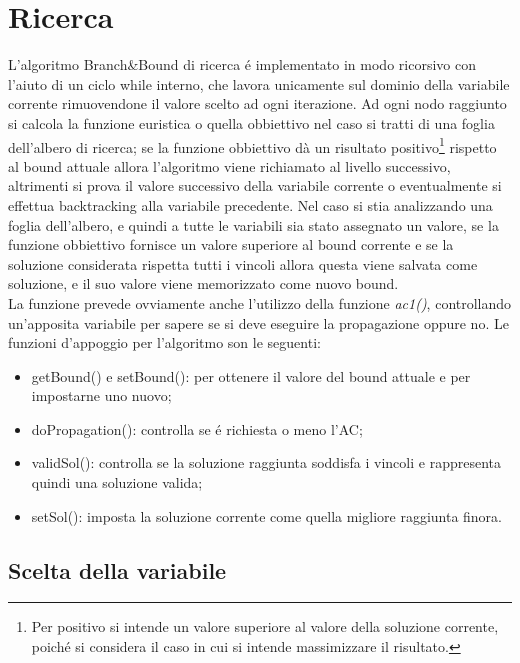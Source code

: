\documentclass[a4paper,12pt,italian]{article}
\begin{document}
\section{Ricerca}


L'algoritmo Branch\&Bound di ricerca \'e implementato in modo ricorsivo
con l'aiuto di un ciclo while interno, che lavora unicamente sul
dominio della variabile corrente rimuovendone il valore scelto ad ogni iterazione.
Ad ogni nodo raggiunto si calcola la funzione euristica o quella obbiettivo nel caso si tratti
di una foglia dell'albero di ricerca; se la funzione obbiettivo d\`a un
risultato positivo\footnote{Per positivo si intende un valore
  superiore al valore della soluzione corrente, poich\'e
si considera il caso in cui si intende massimizzare il risultato.} 
rispetto al bound attuale allora l'algoritmo viene
richiamato al livello successivo, altrimenti si prova il valore successivo
della variabile corrente o eventualmente si effettua backtracking alla
variabile precedente. Nel caso si stia analizzando una foglia dell'albero, e quindi a tutte
le variabili sia stato assegnato un valore, se la funzione obbiettivo fornisce
un valore superiore al bound corrente e se la soluzione considerata rispetta
tutti i vincoli allora questa viene salvata come soluzione, e il suo valore viene
memorizzato come nuovo bound.\\
La funzione prevede ovviamente anche l'utilizzo della funzione \textit{ac1()}, controllando
un'apposita variabile per sapere se si deve eseguire la propagazione oppure no.
Le funzioni d'appoggio per l'algoritmo son le seguenti:

\begin{itemize}
 \item getBound() e setBound(): per ottenere il valore del bound attuale e per impostarne uno nuovo;
 \item doPropagation(): controlla se \'e richiesta o meno l'AC;
 \item validSol(): controlla se la soluzione raggiunta soddisfa i vincoli e rappresenta quindi
una soluzione valida; 
 \item setSol(): imposta la soluzione corrente come quella migliore raggiunta finora.
\end{itemize}

\subsection{Scelta della variabile}
\end{document}
